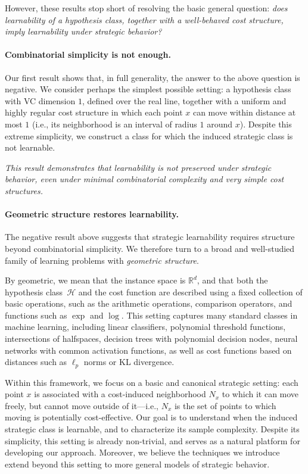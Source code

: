 \documentclass[11pt]{article}
\theoremstyle{plain}
\theoremstyle{definition}
\theoremstyle{remark}
\begin{document}
However, these results stop short of resolving the basic general question:
\emph{does learnability of a hypothesis class, together with a well-behaved cost structure, imply learnability under strategic behavior?}

\paragraph{Combinatorial simplicity is not enough.}
Our first result shows that, in full generality, the answer to the above question is negative.
We consider perhaps the simplest possible setting:
a hypothesis class with VC dimension $1$, defined over the real line,
together with a uniform and highly regular cost structure in which each point $x$ can move within distance at most $1$ (i.e., its neighborhood is an interval of radius $1$ around $x$).
Despite this extreme simplicity,
we construct a class for which the induced strategic class is not learnable. 

\emph{This result demonstrates that learnability is not preserved under strategic behavior,
even under minimal combinatorial complexity and very simple cost structures.}

\paragraph{Geometric structure restores learnability.}
The negative result above suggests that strategic learnability requires structure beyond
combinatorial simplicity.
We therefore turn to a broad and well-studied family of learning problems
with \emph{geometric structure}.

By geometric, we mean that the instance space is $\mathbb{R}^d$,
and that both the hypothesis class~$\mathcal{H}$ and the cost function
are described using a fixed collection of basic operations,
such as the arithmetic operations, comparison operators,
and functions such as $\exp$ and $\log$.
This setting captures many standard classes in machine learning,
including linear classifiers, polynomial threshold functions,
intersections of halfspaces,
decision trees with polynomial decision nodes, neural networks with common activation functions,
as well as cost functions based on distances such as $\ell_p$ norms or KL divergence.

Within this framework, we focus on a basic and canonical strategic setting:
each point $x$ is associated with a cost-induced neighborhood $N_x$ to which it can move freely,
but cannot move outside of it---i.e., $N_x$ is the set of points to which moving is potentially cost-effective.
Our goal is to understand when the induced strategic class is learnable,
and to characterize its sample complexity.
Despite its simplicity, this setting is already non-trivial,
and serves as a natural platform for developing our approach.
Moreover, we believe the techniques we introduce extend beyond this setting
to more general models of strategic behavior.
\end{document}
